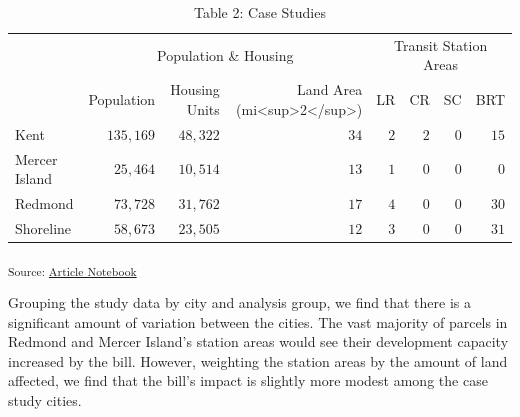\documentclass[
]{agujournal2019}
\begin{document}
\begin{longtable}{l|rrrrrrr}
\caption{Table 2: Case Studies}\tabularnewline

\toprule
\multicolumn{1}{l}{} & \multicolumn{3}{c}{Population \& Housing} & \multicolumn{4}{c}{Transit Station Areas} \\ 
\cmidrule(lr){2-4} \cmidrule(lr){5-8}
\multicolumn{1}{l}{} & Population & Housing Units & Land Area (mi<sup>2</sup>) & LR & CR & SC & BRT \\ 
\midrule
Kent & $135,169$ & $48,322$ & $34$ & $2$ & $2$ & $0$ & $15$ \\ 
Mercer Island & $25,464$ & $10,514$ & $13$ & $1$ & $0$ & $0$ & $0$ \\ 
Redmond & $73,728$ & $31,762$ & $17$ & $4$ & $0$ & $0$ & $30$ \\ 
Shoreline & $58,673$ & $23,505$ & $12$ & $3$ & $0$ & $0$ & $31$ \\ 
\bottomrule
\end{longtable}

\textsubscript{Source:
\href{https://tiernanmartin.github.io/2024-transit-oriented-development-bill/index.qmd.html}{Article
Notebook}}

Grouping the study data by city and analysis group, we find that there
is a significant amount of variation between the cities. The vast
majority of parcels in Redmond and Mercer Island's station areas would
see their development capacity increased by the bill. However, weighting
the station areas by the amount of land affected, we find that the
bill's impact is slightly more modest among the case study cities.
\end{document}
